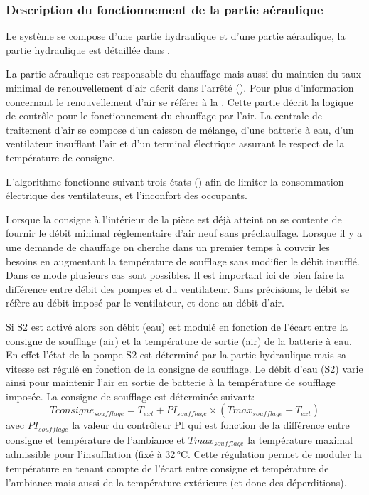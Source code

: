 \subsubsection{Description du fonctionnement de la partie aéraulique} %
\label{ssub:description_du_fonctionnement_de_la_partie_aeraulique}

Le système se compose d’une partie hydraulique et d’une partie aéraulique, la partie
hydraulique est détaillée dans .

La partie aéraulique est responsable du chauffage mais aussi du maintien du taux minimal
de renouvellement d’air décrit dans l’arrêté (). Pour plus d’information concernant
le renouvellement d’air se référer à la .
Cette partie décrit la logique de contrôle pour le fonctionnement du chauffage par l’air.
La centrale de traitement d’air se compose d’un caisson de mélange, d’une batterie à eau,
d’un ventilateur insufflant l’air et d’un terminal électrique assurant le respect de la température
de consigne.

L’algorithme fonctionne suivant trois états () afin de limiter
la consommation électrique des ventilateurs, et l’inconfort des occupants.

Lorsque la consigne à l’intérieur de la pièce est déjà atteint on se contente de fournir
le débit minimal réglementaire d’air neuf sans préchauffage. Lorsque il y a une demande de
chauffage on cherche dans un premier temps à couvrir les besoins en augmentant la température
de soufflage sans modifier le débit insufflé. Dans ce mode plusieurs cas sont possibles.
Il est important ici de bien faire la différence entre débit des pompes et du ventilateur.
Sans précisions, le débit se réfère au débit imposé par le ventilateur, et donc au débit d’air.

Si S2 est activé alors son débit (eau) est modulé en fonction de l’écart entre la consigne de soufflage (air)
et la température de sortie (air) de la batterie à eau. En effet l’état de la pompe S2 est déterminé
par la partie hydraulique mais sa vitesse est régulé en fonction de la consigne de soufflage.
Le débit d’eau (S2) varie ainsi pour maintenir l’air en sortie de batterie à la température
de soufflage imposée. La consigne de soufflage est déterminée suivant:
\begin{equation}\label{eq:consigne_soufflage}
    Tconsigne_{soufflage} = T_{ext} + PI_{soufflage} \times (Tmax_{soufflage} - T_{ext})
\end{equation}
avec $PI_{soufflage}$ la valeur du contrôleur PI qui est fonction de la différence entre consigne
et température de l’ambiance et $Tmax_{soufflage}$ la température maximal admissible pour l’insufflation
(fixé à 32\,\si{\degreeCelsius}.
Cette régulation permet de moduler la température en tenant compte de l’écart entre
consigne et température de l’ambiance mais aussi de la température extérieure (et donc des
déperditions).

